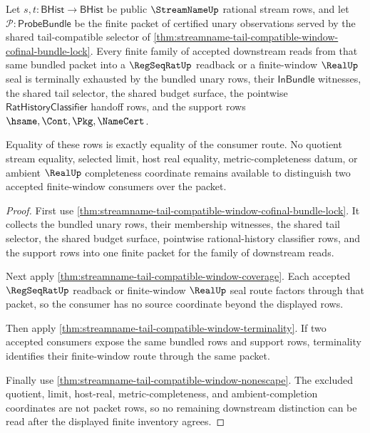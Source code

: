 \begin{theorem}
\label{thm:streamname-tail-compatible-window-cofinal-exhaustion}
Let $s,t:\mathsf{BHist}\to\mathsf{BHist}$ be public $\StreamNameUp$ rational
stream rows, and let $\mathcal P:\mathsf{ProbeBundle}$ be the finite packet of
certified unary observations served by the shared tail-compatible selector of
\autoref{thm:streamname-tail-compatible-window-cofinal-bundle-lock}. Every
finite family of accepted downstream reads from that same bundled packet into a
$\RegSeqRatUp$ readback or a finite-window $\RealUp$ seal is terminally
exhausted by the bundled unary rows, their $\mathsf{InBundle}$ witnesses, the
shared tail selector, the shared budget surface, the pointwise
$\mathsf{RatHistoryClassifier}$ handoff rows, and the support rows
$\hsame,\Cont,\Pkg,\NameCert$.

Equality of these rows is exactly equality of the consumer route. No quotient
stream equality, selected limit, host real equality, metric-completeness datum,
or ambient $\RealUp$ completeness coordinate remains available to distinguish
two accepted finite-window consumers over the packet.
\end{theorem}
\begin{proof}
First use
\autoref{thm:streamname-tail-compatible-window-cofinal-bundle-lock}. It collects
the bundled unary rows, their membership witnesses, the shared tail selector,
the shared budget surface, pointwise rational-history classifier rows, and the
support rows into one finite packet for the family of downstream reads.

Next apply \autoref{thm:streamname-tail-compatible-window-coverage}. Each
accepted $\RegSeqRatUp$ readback or finite-window $\RealUp$ seal route factors
through that packet, so the consumer has no source coordinate beyond the
displayed rows.

Then apply \autoref{thm:streamname-tail-compatible-window-terminality}. If two
accepted consumers expose the same bundled rows and support rows, terminality
identifies their finite-window route through the same packet.

Finally use \autoref{thm:streamname-tail-compatible-window-nonescape}. The
excluded quotient, limit, host-real, metric-completeness, and ambient-completion
coordinates are not packet rows, so no remaining downstream distinction can be
read after the displayed finite inventory agrees.
\end{proof}
